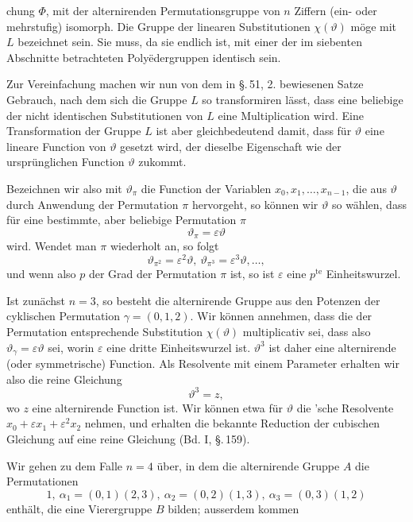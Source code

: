 chung $\Phi$, mit der alternirenden Permutationsgruppe von $n$ Ziffern
(ein- oder mehrstufig) isomorph. Die Gruppe der linearen Substitutionen
 $\chi(\vartheta)$ möge mit $L$ bezeichnet sein. Sie muss, da sie
endlich ist, mit einer der im siebenten Abschnitte betrachteten
Polyëdergruppen identisch sein.

Zur Vereinfachung machen wir nun von dem in \S.\,51, 2.
bewiesenen Satze Gebrauch, nach dem sich die Gruppe $L$ so
transformiren lässt, dass eine beliebige der nicht identischen
Substitutionen von $L$ eine Multiplication wird. Eine Transformation
 der Gruppe $L$ ist aber gleichbedeutend damit, dass für $\vartheta$
eine lineare Function von $\vartheta$ gesetzt wird, der dieselbe Eigenschaft
 wie der ursprünglichen Function $\vartheta$ zukommt.

Bezeichnen wir also mit $\vartheta_\pi$ die Function der Variablen
$x_0, x_1, \ldots, x_{n-1}$, die aus $\vartheta$ durch Anwendung der Permutation $\pi$
hervorgeht, so können wir $\vartheta$ so wählen, dass für eine bestimmte,
aber beliebige Permutation $\pi$
\[
\vartheta_\pi = \varepsilon\vartheta
\]
wird. Wendet man $\pi$ wiederholt an, so folgt
\[
\vartheta_{\pi^2} = \varepsilon^2\vartheta,\ \vartheta_{\pi^3} = \varepsilon^3\vartheta, \ldots,
\]
und wenn also $p$ der Grad der Permutation $\pi$ ist, so ist $\varepsilon$ eine
$p^{\text{te}}$ Einheitswurzel.

Ist zunächst $n = 3$, so besteht die alternirende Gruppe aus
den Potenzen der cyklischen Permutation $\gamma = (0, 1, 2)$. Wir
können annehmen, dass die der Permutation entsprechende Substitution
 $\chi(\vartheta)$ multiplicativ sei, dass also $\vartheta_\gamma = \varepsilon\vartheta$ sei, worin $\varepsilon$
eine dritte Einheitswurzel ist. $\vartheta^3$ ist daher eine alternirende
(oder symmetrische) Function. Als Resolvente mit einem Parameter
 erhalten wir also die reine Gleichung
\[
\vartheta^3 = z,
\]
wo $z$ eine alternirende Function ist. Wir können etwa für $\vartheta$
die 'sche Resolvente $x_0 + \varepsilon x_1 + \varepsilon^2 x_2$ nehmen, und
erhalten die bekannte Reduction der cubischen Gleichung auf
eine reine Gleichung (Bd. I, \S.\,159).

Wir gehen zu dem Falle $n = 4$ über, in dem die alternirende
 Gruppe $A$ die Permutationen
\[
1,\ \alpha_1 = (0, 1)(2, 3),\ \alpha_2 = (0, 2)(1, 3),\ \alpha_3 = (0, 3)(1, 2)
\]
enthält, die eine Vierergruppe $B$ bilden; ausserdem kommen
